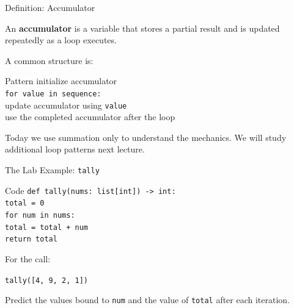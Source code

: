 \documentclass[aspectratio=169,10pt]{beamer}
\begin{document}
\begin{frame}{Definition: Accumulator}
  \begin{cpdefinition}
    An \textbf{accumulator} is a variable that stores a partial result and is updated repeatedly as a loop executes.
  \end{cpdefinition}

  A common structure is:

  \begin{block}{Pattern}
    initialize accumulator\\
    \texttt{for value in sequence:}\\
    \hspace{0.20in}update accumulator using \texttt{value}\\
    use the completed accumulator after the loop
  \end{block}

  Today we use summation only to understand the mechanics. We will study additional loop patterns next lecture.
\end{frame}

\begin{frame}{The Lab Example: \texttt{tally}}
  \begin{block}{Code}
    \texttt{def tally(nums: list[int]) -> int:}\\
    \hspace{0.20in}\texttt{total = 0}\\
    \hspace{0.20in}\texttt{for num in nums:}\\
    \hspace{0.40in}\texttt{total = total + num}\\
    \hspace{0.20in}\texttt{return total}
  \end{block}

  For the call:
  \begin{center}
    \texttt{tally([4, 9, 2, 1])}
  \end{center}

  \begin{activity}
    Predict the values bound to \texttt{num} and the value of \texttt{total} after each iteration.
  \end{activity}
\end{frame}
\end{document}
